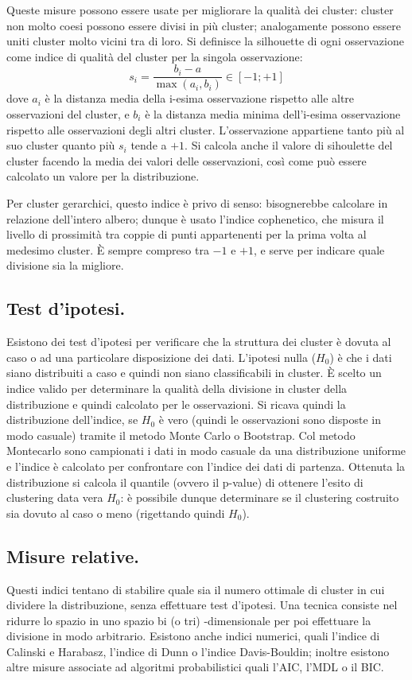 \documentclass[11pt, a4page, twocolumn]{article}
\begin{document}
Queste misure possono essere usate per migliorare la qualità dei cluster: cluster non molto coesi possono essere divisi in più cluster; analogamente possono essere uniti cluster molto vicini tra di loro.
Si definisce la silhouette di ogni osservazione come indice di qualità del cluster per la singola osservazione:
\begin{equation*}
  s_i = \frac{b_i - a}{\max{(a_i, b_i)}} \in [-1; +1]
\end{equation*}
dove $a_i$ è la distanza media della i-esima osservazione rispetto alle altre osservazioni del cluster, e $b_i$ è la distanza media minima dell'i-esima osservazione rispetto alle osservazioni degli altri cluster.
L'osservazione appartiene tanto più al suo cluster quanto più $s_i$ tende a $+1$.
Si calcola anche il valore di sihoulette del cluster facendo la media dei valori delle osservazioni, così come può essere calcolato un valore per la distribuzione.

Per cluster gerarchici, questo indice è privo di senso: bisognerebbe calcolare in relazione dell'intero albero; dunque è usato l'indice cophenetico, che misura il livello di prossimità tra coppie di punti appartenenti per la prima volta al medesimo cluster.
È sempre compreso tra $-1$ e $+1$, e serve per indicare quale divisione sia la migliore. \newline

\subsection{Test d'ipotesi.}
Esistono dei test d'ipotesi per verificare che la struttura dei cluster è dovuta al caso o ad una particolare disposizione dei dati.
L'ipotesi nulla ($H_0$) è che i dati siano distribuiti a caso e quindi non siano classificabili in cluster.
È scelto un indice valido per determinare la qualità della divisione in cluster della distribuzione e quindi calcolato per le osservazioni.
Si ricava quindi la distribuzione dell'indice, se $H_0$ è vero (quindi le osservazioni sono disposte in modo casuale) tramite il metodo Monte Carlo o Bootstrap.
Col metodo Montecarlo sono campionati i dati in modo casuale da una distribuzione uniforme e l'indice è calcolato per confrontare con l'indice dei dati di partenza.
Ottenuta la distribuzione si calcola il quantile (ovvero il p-value) di ottenere l'esito di clustering data vera $H_0$: è possibile dunque determinare se il clustering costruito sia dovuto al caso o meno (rigettando quindi $H_0$).

\subsection{Misure relative.}
Questi indici tentano di stabilire quale sia il numero ottimale di cluster in cui dividere la distribuzione, senza effettuare test d'ipotesi.
Una tecnica consiste nel ridurre lo spazio in uno spazio bi (o tri) -dimensionale per poi effettuare la divisione in modo arbitrario.
Esistono anche indici numerici, quali l'indice di Calinski e Harabasz, l'indice di Dunn o l'indice Davis-Bouldin; inoltre esistono altre misure associate ad algoritmi probabilistici quali l'AIC, l'MDL o il BIC.
\end{document}
